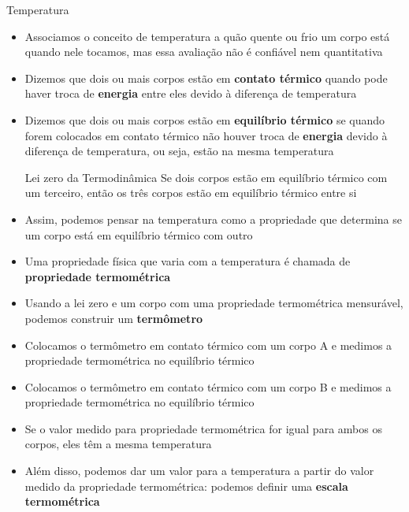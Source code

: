 \begin{frame}{Temperatura} 
    \begin{itemize} 
        \item Associamos o conceito de temperatura a quão quente ou frio um corpo está quando nele
            tocamos, mas essa avaliação não é confiável nem quantitativa 
        \item Dizemos que dois ou mais corpos estão em \textbf{contato térmico} quando
            pode haver troca de \textbf{energia} entre eles devido à diferença de
            temperatura 
        \item Dizemos que dois ou mais corpos estão em
            \textbf{equilíbrio térmico} se quando forem colocados em contato térmico
            não houver troca de \textbf{energia} devido à diferença de temperatura, ou
            seja, estão na mesma temperatura 
            \begin{block}{Lei zero da Termodinâmica} 
                Se dois corpos estão em equilíbrio térmico com um terceiro,
                então os três corpos estão em equilíbrio térmico entre si 
            \end{block} \pause
        \item Assim, podemos pensar na temperatura como a propriedade que determina se
            um corpo está em equilíbrio térmico com outro 
    \end{itemize} 
\end{frame}
%
\begin{frame}
    \begin{itemize}
        \item Uma propriedade física que varia com a temperatura é chamada de
            \textbf{propriedade termométrica}
        \item Usando a lei zero e um corpo com uma propriedade termométrica
            mensurável, podemos construir um \textbf{termômetro}
        \item Colocamos o termômetro em contato térmico com um corpo A e
            medimos a propriedade termométrica no equilíbrio térmico
        \item Colocamos o termômetro em contato térmico com um corpo B e
            medimos a propriedade termométrica no equilíbrio térmico
        \item Se o valor medido para propriedade termométrica for igual para
            ambos os corpos, eles têm a mesma temperatura
        \item Além disso, podemos dar um valor para a temperatura a partir do
            valor medido da propriedade termométrica: podemos definir uma
            \textbf{escala termométrica}
    \end{itemize}
\end{frame}

